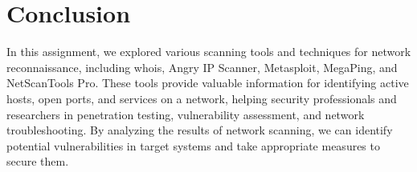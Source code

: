 \documentclass[11pt]{article}
\begin{document}
\section{Conclusion}
In this assignment, we explored various scanning tools and techniques for network reconnaissance, including whois, Angry IP Scanner, Metasploit, MegaPing, and NetScanTools Pro. These tools provide valuable information for identifying active hosts, open ports, and services on a network, helping security professionals and researchers in penetration testing, vulnerability assessment, and network troubleshooting. By analyzing the results of network scanning, we can identify potential vulnerabilities in target systems and take appropriate measures to secure them.
\clearpage

\pagebreak
\end{document}
